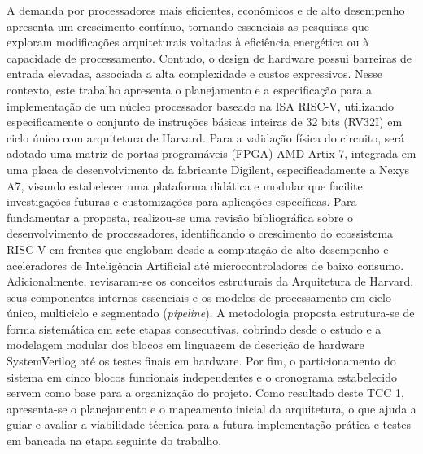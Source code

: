
\begin{resumoutfpr}%

A demanda por processadores mais eficientes, econômicos e de alto desempenho apresenta um crescimento contínuo, tornando essenciais as pesquisas que exploram modificações arquiteturais voltadas à eficiência energética ou à capacidade de processamento. Contudo, o design de hardware possui barreiras de entrada elevadas, associada a alta complexidade e custos expressivos. Nesse contexto, este trabalho apresenta o planejamento e a especificação para a implementação de um núcleo processador baseado na ISA RISC-V, utilizando especificamente o conjunto de instruções básicas inteiras de 32 bits (RV32I) em ciclo único com arquitetura de Harvard. Para a validação física do circuito, será adotado uma matriz de portas programáveis (FPGA) AMD Artix-7, integrada em uma placa de desenvolvimento da fabricante Digilent, especificadamente a Nexys A7, visando estabelecer uma plataforma didática e modular que facilite investigações futuras e customizações para aplicações específicas. Para fundamentar a proposta, realizou-se uma revisão bibliográfica sobre o desenvolvimento de processadores, identificando o crescimento do ecossistema RISC-V em frentes que englobam desde a computação de alto desempenho e aceleradores de Inteligência Artificial até microcontroladores de baixo consumo. Adicionalmente, revisaram-se os conceitos estruturais da Arquitetura de Harvard, seus componentes internos essenciais e os modelos de processamento em ciclo único, multiciclo e segmentado (\textit{pipeline}). A metodologia proposta estrutura-se de forma sistemática em sete etapas consecutivas, cobrindo desde o estudo e a modelagem modular dos blocos em linguagem de descrição de hardware SystemVerilog até os testes finais em hardware. Por fim, o particionamento do sistema em cinco blocos funcionais independentes e o cronograma estabelecido servem como base para a organização do projeto. Como resultado deste TCC 1, apresenta-se o planejamento e o mapeamento inicial da arquitetura, o que ajuda a guiar e avaliar a viabilidade técnica para a futura implementação prática e testes em bancada na etapa seguinte do trabalho.

\end{resumoutfpr}

